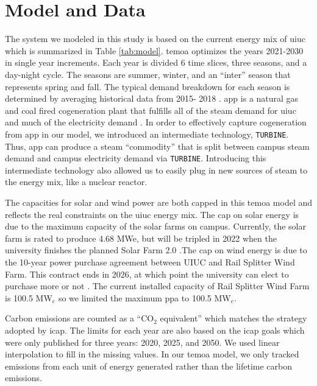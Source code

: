 \section{Model and Data}

The system we modeled in this study is based on the current energy mix of
\gls{uiuc} which is summarized in Table \ref{tab:model}. \gls{temoa} optimizes
the years 2021-2030 in single year increments. Each year is divided 6 time
slices, three seasons, and a day-night cycle. The seasons are summer, winter,
and an ``inter'' season that represents spring and fall. The typical demand
breakdown for each season is determined by averaging historical data from 2015-
2018 \cite{marquissee_uiuc_2019}. \gls{app} is a natural gas and coal fired
cogeneration plant that fulfills all of the steam demand for \gls{uiuc} and
much of the electricity demand \cite{affiliated_engineers_inc_utilities_2015}.
In order to effectively capture cogeneration from \gls{app} in our model, we
introduced an intermediate technology, \texttt{TURBINE}. Thus, \gls{app} can
produce a steam ``commodity'' that is split between campus steam demand and
campus electricity demand via \texttt{TURBINE}. Introducing this intermediate
technology also allowed us to easily plug in new sources of steam to the
energy mix, like a nuclear reactor.

The capacities for solar and wind power are both capped in this \gls{temoa}
model and reflects the real constraints on the \gls{uiuc} energy mix.
The cap on solar energy is due to the maximum capacity of the solar
farms on campus. Currently, the solar farm is rated to produce 4.68 MWe, but
will be tripled in 2022 when the university finishes the planned
Solar Farm 2.0 \cite{noauthor_solar_nodate,white_solar_2017}.The cap on wind
energy is due to the 10-year power purchase agreement between UIUC and Rail
Splitter Wind Farm. This contract ends in 2026, at which point the university
can elect to purchase more or not \cite{breitweiser_wind_2016}. The current
installed capacity of Rail Splitter Wind Farm is 100.5 MW$_e$ so we limited
the maximum \gls{ppa} to 100.5 MW$_e$.

Carbon emissions are counted as a ``CO$_2$ equivalent'' which matches the
strategy adopted by \gls{icap}. The limits for each year are also based on
the \gls{icap} goals which were only published for three years: 2020, 2025, and
2050. We used linear interpolation to fill in the missing values. In our
\gls{temoa} model, we only tracked emissions from each unit of energy generated
rather than the lifetime carbon emissions.  

